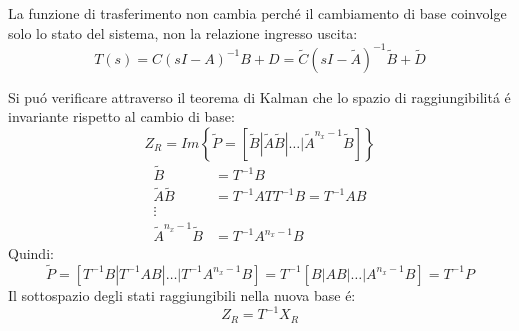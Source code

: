 \documentclass[../main.tex]{subfiles}
\begin{document}
		La funzione di trasferimento non cambia perch\'e il cambiamento di base coinvolge solo lo stato del sistema, non la relazione ingresso uscita:
		\[ 
			T(s) = C(sI-A)^{-1}B+D = \tilde C (sI-\tilde A)^{-1} \tilde B + \tilde D
		\]
		
		Si pu\'o verificare attraverso il teorema di Kalman che lo spazio di raggiungibilit\'a \'e invariante rispetto al cambio di base:
		\[ 
			Z_R = Im\left\lbrace \tilde P = \left[ \tilde B | \tilde A \tilde B | \dots | \tilde A^{n_x-1} \tilde B \right] \right\rbrace
		\]
		\begin{align*}
			\tilde B &= T^{-1} B
			\\
			\tilde A \tilde B &= T^{-1}AT T^{-1}B = T^{-1}AB
			\\\vdots\\
			\tilde A^{n_x-1} \tilde B &= T^{-1}A^{n_x-1}B
		\end{align*}
		Quindi:
		\[
			\tilde P = \left[ T^{-1} B | T^{-1} AB | \dots | T^{-1} A^{n_x-1}B \right] = T^{-1} \left[ B | AB | \dots | A^{n_x-1}B \right] = T^{-1}P
		\]
		Il sottospazio degli stati raggiungibili nella nuova base \'e:
		\[
			Z_R = T^{-1} X_R
		\]
		
\end{document}
